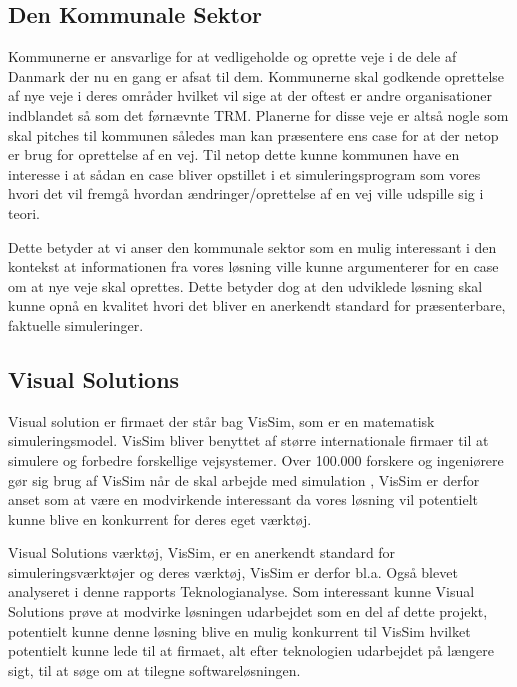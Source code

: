 \subsection {Den Kommunale Sektor}
Kommunerne er ansvarlige for at vedligeholde og oprette veje i de dele af Danmark der nu en gang er afsat til dem. Kommunerne skal godkende oprettelse af nye veje i deres områder hvilket vil sige at der oftest er andre organisationer indblandet så som det førnævnte TRM. Planerne for disse veje er altså nogle som skal pitches til kommunen således man kan præsentere ens case for at der netop er brug for oprettelse af en vej. Til netop dette kunne kommunen have en interesse i at sådan en case bliver opstillet i et simuleringsprogram som vores hvori det vil fremgå hvordan ændringer/oprettelse af en vej ville udspille sig i teori.

\vspace{5mm}

Dette betyder at vi anser den kommunale sektor som en mulig interessant i den kontekst at informationen fra vores løsning ville kunne argumenterer for en case om at nye veje skal oprettes. Dette betyder dog at den udviklede løsning skal kunne opnå en kvalitet hvori det bliver en anerkendt standard for præsenterbare, faktuelle simuleringer.

\subsection{Visual Solutions}
Visual solution er firmaet der står bag VisSim, som er en matematisk simuleringsmodel. VisSim bliver benyttet af større internationale firmaer til at simulere og forbedre forskellige vejsystemer. Over 100.000 forskere og ingeniørere gør sig brug af VisSim når de skal arbejde med simulation\cite{VisualSolutions}
, VisSim er derfor anset som at være en modvirkende interessant da vores løsning vil potentielt kunne blive en konkurrent for deres eget værktøj.

\vspace{5mm}

Visual Solutions værktøj, VisSim, er en anerkendt standard for simuleringsværktøjer og deres værktøj, VisSim er derfor bl.a. Også blevet analyseret i denne rapports Teknologianalyse. Som interessant kunne Visual Solutions prøve at modvirke løsningen udarbejdet som en del af dette projekt, potentielt kunne denne løsning blive en mulig konkurrent til VisSim hvilket potentielt kunne lede til at firmaet, alt efter teknologien udarbejdet på længere sigt, til at søge om at tilegne softwareløsningen.

